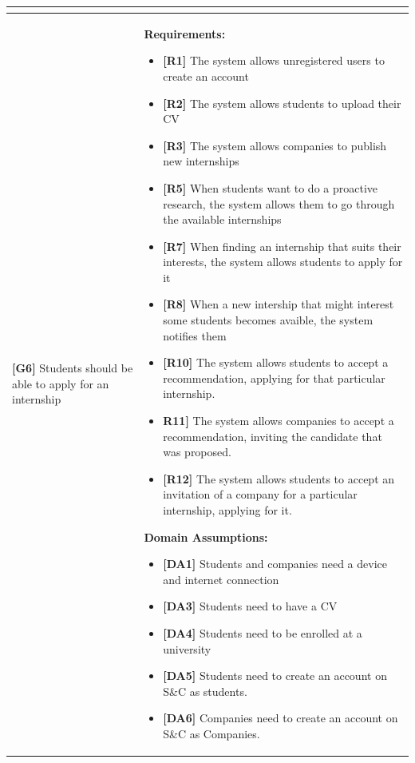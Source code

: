 \begin{longtable}{|p{}|p{}|}
\begin{itemize}
\end{itemize} \\
\hline
\hline
\textbf{[G6]}  Students should be able to apply for an internship
& 
\textbf{Requirements:}
\begin{itemize}
    \item \textbf{[R1]} The system allows unregistered users to create an account
    \item \textbf{[R2]} The system allows students to upload their CV
    \item \textbf{[R3]} The system allows companies to publish new internships
    \item \textbf{[R5]} When students want to do a proactive research, the system allows them to go through the available internships
    \item \textbf{[R7]} When finding an internship that suits their interests, the system allows students to apply for it
    \item  \textbf{[R8]} When a new intership that might interest some students becomes avaible, the system notifies them
    \item  \textbf{[R10]} The system allows students to accept a recommendation, applying for that particular internship.
    \item  \textbf{R11]} The system allows companies to accept a recommendation, inviting the candidate that was proposed.
    \item \textbf{[R12]} The system allows students to accept an invitation of a company for a particular internship, applying for it.
\end{itemize}
\textbf{Domain Assumptions:}
\begin{itemize}
     \item \textbf{[DA1]} Students and companies need a device and internet connection
     \item \textbf{[DA3]} Students need to have a CV
     \item \textbf{[DA4]} Students need to be enrolled at a university
    \item \textbf{[DA5]} Students need to create an account on S\&C as students.
    \item \textbf{[DA6]} Companies need to create an account on S\&C as Companies.
\end{itemize} \\
\hline


\end{longtable}
